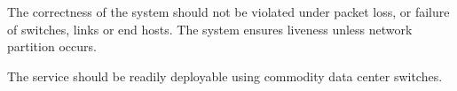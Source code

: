 The correctness of the system should not be violated under packet loss, or failure of switches, links or end hosts.
The system ensures liveness unless network partition occurs.


The service should be readily deployable using commodity data center switches.

\fi
